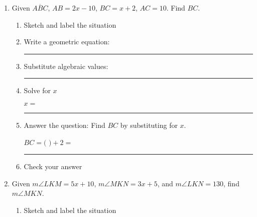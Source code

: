 \documentclass[12pt, oneside]{article}
\begin{document}
\begin{enumerate}
      \item Given $\overline{ABC}$, $AB=2x-10$, $BC=x+2$, $AC=10$. Find ${BC}$.
      \begin{enumerate}
        \item Sketch and label the situation
        \begin{flushright}
        \end{flushright} \vspace{2cm}
        \item Write a geometric equation: \rule{5cm}{0.15mm} \vspace{1cm}
        \item Substitute algebraic values: \rule{5cm}{0.15mm}
        \item Solve for $x$
        \vspace{4cm}
        \begin{center} $x=$ \rule{1cm}{0.15mm} \end{center}
        \item Answer the question: Find $BC$ by substituting for $x$. \bigskip
        \begin{center} $BC=($ \hspace{1cm} $)+2=$ \rule{1cm}{0.15mm} \end{center} \bigskip
        \item Check your answer
      \end{enumerate}
      \vspace{2cm}

      \newpage
      \item Given $m\angle LKM = 5x+10$, $m\angle MKN = 3x+5$, and $m\angle LKN = 130$, find $m\angle MKN$.  \vspace{.2cm}
      \begin{enumerate}
        \item Sketch and label the situation
        \begin{flushright}
        \end{flushright}
        \vspace{1cm}


\end{enumerate}
\end{enumerate}
\end{document}
